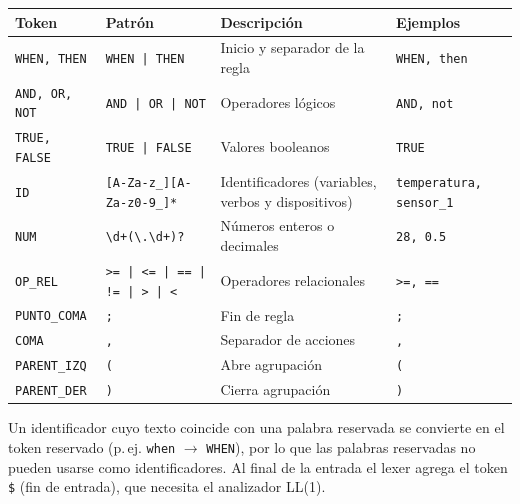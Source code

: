 \begin{center}\small
\begin{tabular}{@{}>{\raggedright\arraybackslash}p{2.5cm} >{\raggedright\arraybackslash}p{4.0cm} >{\raggedright\arraybackslash}p{4.3cm} >{\raggedright\arraybackslash}p{3.3cm}@{}}
\toprule
\textbf{Token} & \textbf{Patrón} & \textbf{Descripción} & \textbf{Ejemplos} \\
\midrule
\texttt{WHEN, THEN} & \texttt{WHEN | THEN} & Inicio y separador de la regla & \texttt{WHEN, then} \\
\texttt{AND, OR, NOT} & \texttt{AND | OR | NOT} & Operadores lógicos & \texttt{AND, not} \\
\texttt{TRUE, FALSE} & \texttt{TRUE | FALSE} & Valores booleanos & \texttt{TRUE} \\
\texttt{ID} & \texttt{[A-Za-z\_][A-Za-z0-9\_]*} & Identificadores (variables, verbos y dispositivos) & \texttt{temperatura, sensor\_1} \\
\texttt{NUM} & \texttt{\textbackslash{}d+(\textbackslash{}.\textbackslash{}d+)?} & Números enteros o decimales & \texttt{28, 0.5} \\
\texttt{OP\_REL} & \texttt{>= | <= | == | != | > | <} & Operadores relacionales & \texttt{>=, ==} \\
\texttt{PUNTO\_COMA} & \texttt{;} & Fin de regla & \texttt{;} \\
\texttt{COMA} & \texttt{,} & Separador de acciones & \texttt{,} \\
\texttt{PARENT\_IZQ} & \texttt{(} & Abre agrupación & \texttt{(} \\
\texttt{PARENT\_DER} & \texttt{)} & Cierra agrupación & \texttt{)} \\
\bottomrule
\end{tabular}
\end{center}

Un identificador cuyo texto coincide con una palabra reservada se convierte en el token reservado
(p.\,ej. \texttt{when} $\to$ \texttt{WHEN}), por lo que las palabras reservadas no pueden usarse como identificadores.
Al final de la entrada el lexer agrega el token \texttt{\$} (fin de entrada), que necesita el analizador LL(1).

